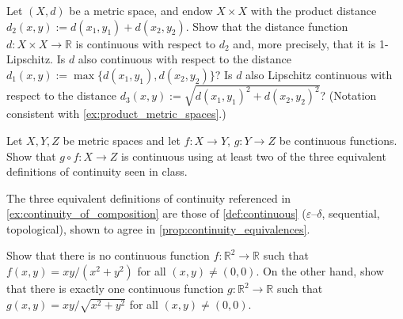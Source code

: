 \begin{exercise}
\label{ex:continuity_of_distance}
Let $(X,d)$ be a metric space, and endow $X \times X$ with the product distance
$d_2(x,y) := d(x_1,y_1) + d(x_2,y_2)$. Show that the distance function
$d : X \times X \to \mathbb{R}$ is continuous with respect to $d_2$ and, more precisely, that it
is 1-Lipschitz. Is $d$ also continuous with respect to the distance
$d_1(x,y) := \max\{d(x_1,y_1), d(x_2,y_2)\}$? Is $d$ also Lipschitz continuous with respect to the
distance $d_3(x,y) := \sqrt{d(x_1,y_1)^2 + d(x_2,y_2)^2}$? (Notation consistent with
\cref{ex:product_metric_spaces}.)
\end{exercise}


\begin{exercise}
\label{ex:continuity_of_composition}
Let $X, Y, Z$ be metric spaces and let $f : X \to Y$, $g : Y \to Z$ be continuous functions. Show
that $g \circ f : X \to Z$ is continuous using at least two of the three equivalent definitions of
continuity seen in class.
\end{exercise}

\begin{remark}
The three equivalent definitions of continuity referenced in \cref{ex:continuity_of_composition}
are those of \cref{def:continuous} ($\varepsilon$--$\delta$, sequential, topological), shown to
agree in \cref{prop:continuity_equivalences}.
\end{remark}


\begin{exercise}
\label{ex:problems_at_origin}
Show that there is no continuous function $f : \mathbb{R}^2 \to \mathbb{R}$ such that
$f(x,y) = xy/(x^2+y^2)$ for all $(x,y) \neq (0,0)$. On the other hand, show that there is exactly
one continuous function $g : \mathbb{R}^2 \to \mathbb{R}$ such that
$g(x,y) = xy/\sqrt{x^2+y^2}$ for all $(x,y) \neq (0,0)$.

\end{exercise}

